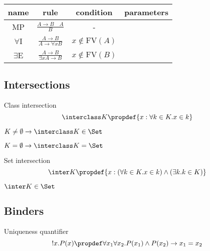 \documentclass[10pt,a4paper]{article}
\begin{document}
\begin{table}[H]
\centering
\begin{tabular}{|c|c|c|c|}
\hline
name & rule & condition & parameters \\ \hline
\hline
MP &  \rule[-2.5ex]{0pt}{7ex} $\frac{A\to B\quad A}{B}$ & - \\ \hline %
\hline
\rule[-2.5ex]{0pt}{7ex}
$\forall$I & $\frac{A\to B}{A\to \forall x B}$ & $x \notin \textrm{FV}(A)$\\ \hline %
\hline
\rule[-2.5ex]{0pt}{7ex}
$\exists$E & $\frac{A\to B}{\exists x A\to B}$ & $x \notin \textrm{FV}(B)$\\ %
\hline
\end{tabular}
\end{table}

\subsection{Intersections}
\begin{definition} Class intersection
$$\interclass K \propdef \{x: \forall k\in K. x\in k\}$$
\end{definition}

\begin{exercise}
$K\neq \emptyset \to \interclass K \in \Set$
\end{exercise}

\begin{exercise}
$K=\emptyset \to \interclass K = \Set$
\end{exercise}

\begin{definition} Set intersection
$$\inter K \propdef \{x: (\forall k\in K. x\in k)\land (\exists k.k\in K)\}$$
\end{definition}

\begin{exercise}
$\inter K \in \Set$
\end{exercise}
\subsection{Binders}
\begin{definition} Uniqueness quantifier
$$!x. P(x) \propdef \forall x_1 \forall x_2. P(x_1)\land P(x_2)\to x_1=x_2$$
\end{definition}
\end{document}
